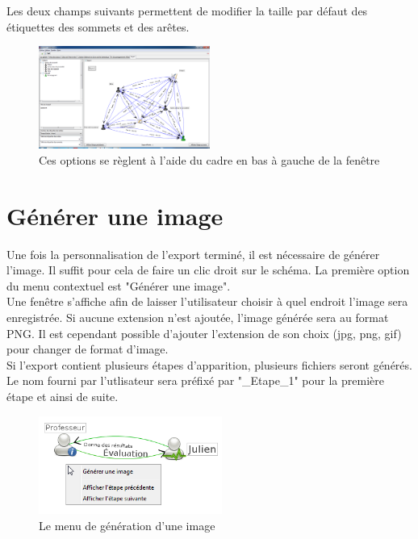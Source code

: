 Les deux champs suivants permettent de modifier la taille par défaut des étiquettes des sommets et des arêtes.\\

\begin{figure}[h!]
\centering
\includegraphics[width=0.5\textwidth]{images/export_global.png}
\caption{Ces options se règlent à l'aide du cadre en bas à gauche de la fenêtre}
\end{figure}


\section{Générer une image}

Une fois la personnalisation de l'export terminé, il est nécessaire de générer l'image. Il suffit pour cela de faire un clic droit sur le schéma. La première option du menu contextuel est "Générer une image".\\

Une fenêtre s'affiche afin de laisser l'utilisateur choisir à quel endroit l'image sera enregistrée. Si aucune extension n'est ajoutée, l'image générée sera au format PNG. Il est cependant possible d'ajouter l'extension de son choix (jpg, png, gif) pour changer de format d'image.\\

Si l'export contient plusieurs étapes d'apparition, plusieurs fichiers seront générés. Le nom fourni par l'utlisateur sera préfixé par "\_Etape\_1" pour la première étape et ainsi de suite.\\

\begin{figure}[h!]
\centering
\includegraphics[width=6cm]{images/generer_image.png}

\caption{Le menu de génération d'une image}

\end{figure}

  


